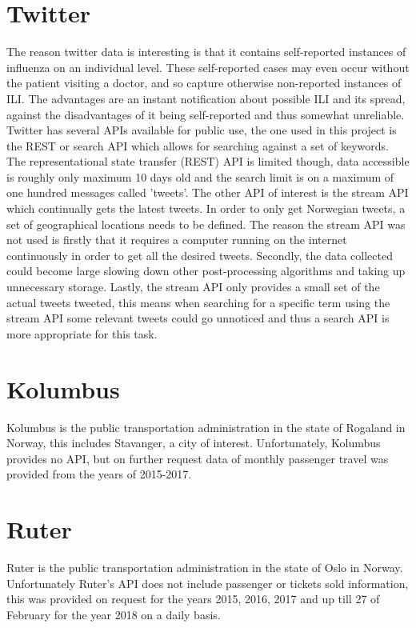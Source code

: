 \section{Twitter}
The reason twitter data is interesting is that it contains self-reported instances of influenza on an individual level. These self-reported cases may even occur without the patient visiting a doctor, and so capture otherwise non-reported instances of ILI. The advantages are an instant notification about possible ILI and its spread, against the disadvantages of it being self-reported and thus somewhat unreliable. Twitter has several APIs available for public use, the one used in this project is the REST or search API which allows for searching against a set of keywords. The representational state transfer (REST) API is limited though, data accessible is roughly only maximum 10 days old and the search limit is on a maximum of one hundred messages called 'tweets'. The other API of interest is the stream API which continually gets the latest tweets. In order to only get Norwegian tweets, a set of geographical locations needs to be defined. The reason the stream API was not used is firstly that it requires a computer running on the internet continuously in order to get all the desired tweets. Secondly, the data collected could become large slowing down other post-processing algorithms and taking up unnecessary storage. Lastly, the stream API only provides a small set of the actual tweets tweeted, this means when searching for a specific term using the stream API some relevant tweets could go unnoticed and thus a search API is more appropriate for this task.

\section{Kolumbus}
Kolumbus is the public transportation administration in the state of Rogaland in Norway, this includes Stavanger, a city of interest. Unfortunately, Kolumbus provides no API, but on further request data of monthly passenger travel was provided from the years of 2015-2017.

\section{Ruter}
Ruter is the public transportation administration in the state of Oslo in Norway. Unfortunately Ruter's API does not include passenger or tickets sold information, this was provided on request for the years 2015, 2016, 2017 and up till 27 of February for the year 2018 on a daily basis.